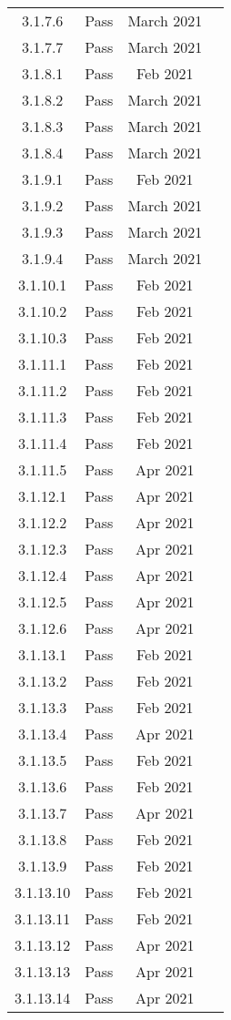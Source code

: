 \documentclass[12pt, titlepage]{article}
\begin{document}
\begin{center}
{\begin{longtable}{ |c|c|c|c| }
3.1.7.6 & Pass & March 2021\\
3.1.7.7 & Pass & March 2021\\
3.1.8.1 & Pass & Feb 2021\\
3.1.8.2 & Pass & March 2021\\
3.1.8.3 & Pass & March 2021\\
3.1.8.4 & Pass & March 2021\\
3.1.9.1 & Pass & Feb 2021\\
3.1.9.2 & Pass & March 2021\\
3.1.9.3 & Pass & March 2021\\
3.1.9.4 & Pass & March 2021\\
3.1.10.1 & Pass & Feb 2021\\
3.1.10.2 & Pass & Feb 2021\\
3.1.10.3 & Pass & Feb 2021\\
3.1.11.1 & Pass & Feb 2021\\
3.1.11.2 & Pass & Feb 2021\\
3.1.11.3 & Pass & Feb 2021\\
3.1.11.4 & Pass & Feb 2021\\
3.1.11.5 & Pass & Apr 2021\\
3.1.12.1 & Pass & Apr 2021\\
3.1.12.2 & Pass & Apr 2021\\
3.1.12.3 & Pass & Apr 2021\\
3.1.12.4 & Pass & Apr 2021\\
3.1.12.5 & Pass & Apr 2021\\
3.1.12.6 & Pass & Apr 2021\\
3.1.13.1 & Pass & Feb 2021\\
3.1.13.2 & Pass & Feb 2021\\
3.1.13.3 & Pass & Feb 2021\\
3.1.13.4 & Pass & Apr 2021\\
3.1.13.5 & Pass & Feb 2021\\
3.1.13.6 & Pass & Feb 2021\\
3.1.13.7 & Pass & Apr 2021\\
3.1.13.8 & Pass & Feb 2021\\
3.1.13.9 & Pass & Feb 2021\\
3.1.13.10 & Pass & Feb 2021\\
3.1.13.11 & Pass & Feb 2021\\
3.1.13.12 & Pass & Apr 2021\\
3.1.13.13 & Pass & Apr 2021\\
3.1.13.14 & Pass & Apr 2021\\

\end{longtable}}
\end{center}
\end{document}
